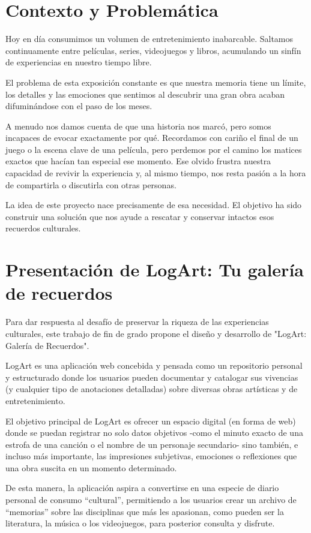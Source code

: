 
\section{Contexto y Problemática}

Hoy en día consumimos un volumen de entretenimiento inabarcable. Saltamos continuamente entre películas, series, videojuegos y libros, acumulando un sinfín de experiencias en nuestro tiempo libre.

El problema de esta exposición constante es que nuestra memoria tiene un límite, los detalles y las emociones que sentimos al descubrir una gran obra acaban difuminándose con el paso de los meses.

A menudo nos damos cuenta de que una historia nos marcó, pero somos incapaces de evocar exactamente por qué. Recordamos con cariño el final de un juego o la escena clave de una película, pero perdemos por el camino los matices exactos que hacían tan especial ese momento. Ese olvido frustra nuestra capacidad de revivir la experiencia y, al mismo tiempo, nos resta pasión a la hora de compartirla o discutirla con otras personas.

La idea de este proyecto nace precisamente de esa necesidad. El objetivo ha sido construir una solución que nos ayude a rescatar y conservar intactos esos recuerdos culturales.
\section{Presentación de LogArt: Tu galería de recuerdos}

Para dar respuesta al desafío de preservar la riqueza de las experiencias culturales, este trabajo de fin de grado propone el diseño y desarrollo de "LogArt: Galería de Recuerdos".

LogArt es una aplicación web concebida y pensada como un repositorio personal y estructurado donde los usuarios pueden documentar y catalogar sus vivencias (y cualquier tipo de anotaciones detalladas) sobre diversas obras artísticas y de entretenimiento.

El objetivo principal de LogArt es ofrecer un espacio digital (en forma de web) donde se puedan registrar no solo datos objetivos -como el minuto exacto de una estrofa de una canción o el nombre de un personaje secundario- sino también, e incluso más importante, las impresiones subjetivas, emociones o reflexiones que una obra suscita en un momento determinado.

De esta manera, la aplicación aspira a convertirse en una especie de diario personal de consumo ``cultural'', permitiendo a los usuarios crear un archivo de ``memorias'' sobre las disciplinas que más les apasionan, como pueden ser la literatura, la música o los videojuegos, para posterior consulta y disfrute.

